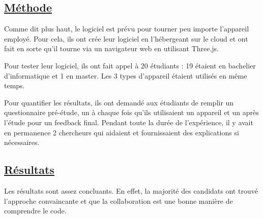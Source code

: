 \documentclass[a4paper,10pt, oneside]{article}
\newcommand{\li}{\newline}
\begin{document}
\subsection{\ul{Méthode}}
		\par Comme dit plus haut, le logiciel est prévu pour tourner peu importe l'appareil employé. Pour cela, ils ont crée leur logiciel en l'hébergeant sur le cloud et ont fait
		en sorte qu'il tourne via un navigateur web en utilisant Three.js.\li
		\par Pour tester leur logiciel, ils ont fait appel à 20 étudiants : 19 étaient en bachelier d'informatique et 1 en master. Les 3 types d'appareil étaient utilisés en même temps.\li
		\par Pour quantifier les résultats, ils ont demandé aux étudiants de remplir un questionnaire pré-étude, un à chaque fois qu'ils utilisaient un appareil et un après l'étude pour un feedback final.
		Pendant toute la durée de l'expérience, il y avait en permanence 2 chercheurs qui aidaient et fournissaient des explications si nécessaires.
\subsection{\ul{Résultats}}
		\par Les résultats sont assez concluants. En effet, la majorité des candidats ont trouvé l'approche convaincante et que la collaboration est une bonne manière de comprendre le code.
\newpage

 
\end{document}
